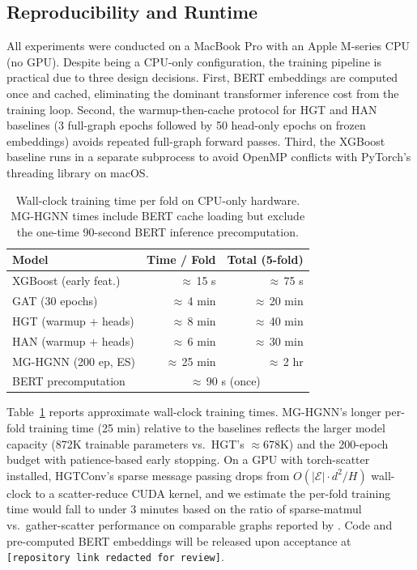 \documentclass[sigconf]{acmart}
\begin{document}
\subsection{Reproducibility and Runtime}
\label{sec:repro}

All experiments were conducted on a MacBook Pro with
an Apple M-series CPU (no GPU). Despite being a
CPU-only configuration, the training pipeline is
practical due to three design decisions.
First, BERT embeddings are computed once and cached,
eliminating the dominant transformer inference cost
from the training loop. Second, the warmup-then-cache
protocol for HGT and HAN baselines (3 full-graph
epochs followed by 50 head-only epochs on frozen
embeddings) avoids repeated full-graph forward passes.
Third, the XGBoost baseline runs in a separate
subprocess to avoid OpenMP conflicts with PyTorch's
threading library on macOS.

\begin{table}[t]
\centering
\caption{Wall-clock training time per fold on
CPU-only hardware. MG-HGNN times include BERT
cache loading but exclude the one-time 90-second
BERT inference precomputation.}
\label{tab:runtime}
\begin{tabular}{lrr}
\toprule
\textbf{Model}
  & \textbf{Time / Fold}
  & \textbf{Total (5-fold)} \\
\midrule
XGBoost (early feat.) & $\approx$\,15 s & $\approx$\,75 s \\
GAT (30 epochs) & $\approx$\,4 min & $\approx$\,20 min \\
HGT (warmup + heads) & $\approx$\,8 min & $\approx$\,40 min \\
HAN (warmup + heads) & $\approx$\,6 min & $\approx$\,30 min \\
MG-HGNN (200 ep, ES) & $\approx$\,25 min & $\approx$\,2 hr \\
\midrule
BERT precomputation & \multicolumn{2}{c}{$\approx$\,90 s (once)} \\
\bottomrule
\end{tabular}
\end{table}

Table~\ref{tab:runtime} reports approximate
wall-clock training times. MG-HGNN's longer
per-fold training time (25 min) relative to the
baselines reflects the larger model capacity
(872K trainable parameters vs.\ HGT's $\approx$678K)
and the 200-epoch budget with patience-based early
stopping. On a GPU with torch-scatter installed,
HGTConv's sparse message passing drops from
$O(|\mathcal{E}| \cdot d^2/H)$ wall-clock to a
scatter-reduce CUDA kernel, and we estimate the
per-fold training time would fall to under 3 minutes
based on the ratio of sparse-matmul vs.\
gather-scatter performance on comparable graphs
reported by \citet{hu2020heterogeneous}.
Code and pre-computed BERT embeddings will be
released upon acceptance at
\texttt{[repository link redacted for review]}.
\end{document}
